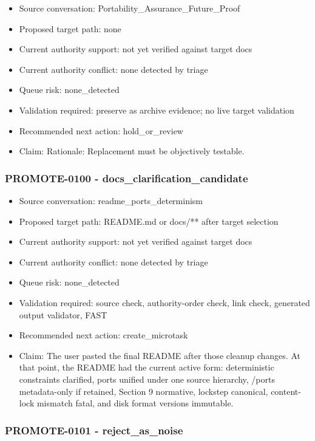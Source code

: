 \documentclass[11pt,a4paper]{report}
\begin{document}
\begin{itemize}
\item Source conversation: Portability\_Assurance\_Future\_Proof
\item Proposed target path: none
\item Current authority support: not yet verified against target docs
\item Current authority conflict: none detected by triage
\item Queue risk: none\_detected
\item Validation required: preserve as archive evidence; no live target validation
\item Recommended next action: hold\_or\_review
\item Claim: Rationale: Replacement must be objectively testable.
\end{itemize}

\subsubsection{PROMOTE-0100 - docs\_clarification\_candidate}

\begin{itemize}
\item Source conversation: readme\_ports\_determinism
\item Proposed target path: README.md or docs/** after target selection
\item Current authority support: not yet verified against target docs
\item Current authority conflict: none detected by triage
\item Queue risk: none\_detected
\item Validation required: source check, authority-order check, link check, generated output validator, FAST
\item Recommended next action: create\_microtask
\item Claim: The user pasted the final README after those cleanup changes. At that point, the README had the current active form: deterministic constraints clarified, ports unified under one source hierarchy, /ports metadata-only if retained, Section 9 normative, lockstep canonical, content-lock mismatch fatal, and disk format versions immutable.
\end{itemize}

\subsubsection{PROMOTE-0101 - reject\_as\_noise}
\end{document}
